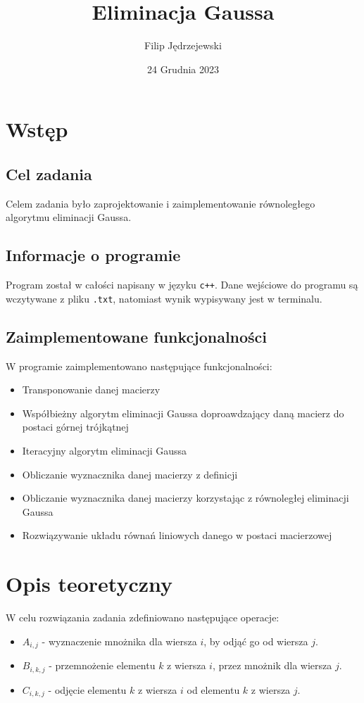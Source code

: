 \documentclass{article}
\title{Eliminacja Gaussa}
\author{Filip Jędrzejewski}
\date{24 Grudnia 2023}
\begin{document}
\maketitle

\section{Wstęp}

\subsection{Cel zadania}

Celem zadania było zaprojektowanie i zaimplementowanie równoległego algorytmu eliminacji Gaussa.

\subsection{Informacje o programie}

Program został w całości napisany w języku \texttt{c++}. Dane wejściowe do programu są wczytywane z pliku \texttt{.txt}, natomiast wynik wypisywany jest w terminalu.

\subsection{Zaimplementowane funkcjonalności}

W programie zaimplementowano następujące funkcjonalności:
\begin{itemize}
    \item Transponowanie danej macierzy
    \item Współbieżny algorytm eliminacji Gaussa doproawdzający daną macierz do postaci górnej trójkątnej
    \item Iteracyjny algorytm eliminacji Gaussa
    \item Obliczanie wyznacznika danej macierzy z definicji
    \item Obliczanie wyznacznika danej macierzy korzystając z równoległej eliminacji Gaussa
    \item Rozwiązywanie układu równań liniowych danego w postaci macierzowej
\end{itemize}

\section{Opis teoretyczny}

W celu rozwiązania zadania zdefiniowano następujące operacje:
\begin{itemize}
    \item $A_{i,j}$ - wyznaczenie mnożnika dla wiersza $i$, by odjąć go od wiersza $j$.
    \item $B_{i,k,j}$ - przemnożenie elementu $k$ z wiersza $i$, przez mnożnik dla wiersza $j$.
    \item $C_{i,k,j}$ - odjęcie elementu $k$ z wiersza $i$ od elementu $k$ z wiersza $j$.
\end{itemize}
\end{document}
